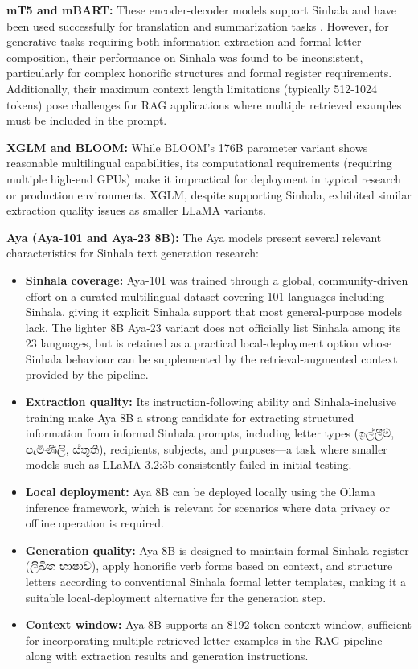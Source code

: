 \documentclass[12pt]{uomthesis}
\newcommand{\si}[1]{{\sinhalafont #1}}
\begin{document}
\textbf{mT5 and mBART:} These encoder-decoder models support Sinhala and have been used successfully for translation and summarization tasks \cite{11}. However, for generative tasks requiring both information extraction and formal letter composition, their performance on Sinhala was found to be inconsistent, particularly for complex honorific structures and formal register requirements. Additionally, their maximum context length limitations (typically 512-1024 tokens) pose challenges for RAG applications where multiple retrieved examples must be included in the prompt.

\textbf{XGLM and BLOOM:} While BLOOM's 176B parameter variant shows reasonable multilingual capabilities, its computational requirements (requiring multiple high-end GPUs) make it impractical for deployment in typical research or production environments. XGLM, despite supporting Sinhala, exhibited similar extraction quality issues as smaller LLaMA variants.

\textbf{Aya (Aya-101 and Aya-23 8B):} The Aya models present several relevant characteristics for Sinhala text generation research:

\begin{itemize}
    \item \textbf{Sinhala coverage:} Aya-101 was trained through a global, community-driven effort on a curated multilingual dataset covering 101 languages including Sinhala, giving it explicit Sinhala support that most general-purpose models lack. The lighter 8B Aya-23 variant does not officially list Sinhala among its 23 languages, but is retained as a practical local-deployment option whose Sinhala behaviour can be supplemented by the retrieval-augmented context provided by the pipeline.

    \item \textbf{Extraction quality:} Its instruction-following ability and Sinhala-inclusive training make Aya 8B a strong candidate for extracting structured information from informal Sinhala prompts, including letter types (\si{ඉල්ලීම්, පැමිණිලි, ස්තූති}), recipients, subjects, and purposes—a task where smaller models such as LLaMA 3.2:3b consistently failed in initial testing.

    \item \textbf{Local deployment:} Aya 8B can be deployed locally using the Ollama inference framework, which is relevant for scenarios where data privacy or offline operation is required.

    \item \textbf{Generation quality:} Aya 8B is designed to maintain formal Sinhala register (\si{ලිඛිත භාෂාව}), apply honorific verb forms based on context, and structure letters according to conventional Sinhala formal letter templates, making it a suitable local-deployment alternative for the generation step.

    \item \textbf{Context window:} Aya 8B supports an 8192-token context window, sufficient for incorporating multiple retrieved letter examples in the RAG pipeline along with extraction results and generation instructions.
\end{itemize}
\end{document}
